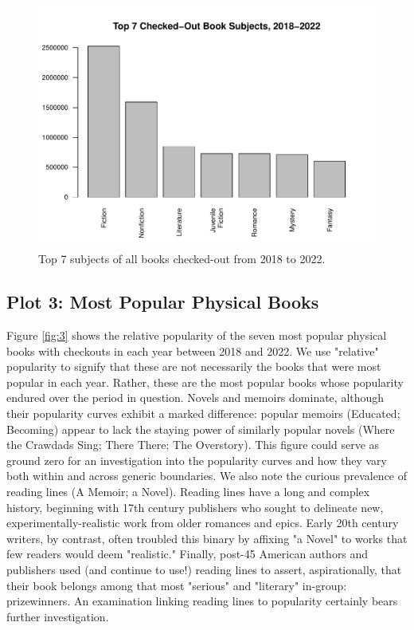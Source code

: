 \documentclass[10pt]{article}\usepackage[]{graphicx}\usepackage[]{color}
\makeatletter
\def\maxwidth{ %
  \ifdim\Gin@nat@width>\linewidth
    \linewidth
  \else
    \Gin@nat@width
  \fi
}
\newenvironment{knitrout}{}{} %
\makeatother
\begin{document}
\begin{figure}[H]
\begin{center}
\begin{knitrout}
\color{fgcolor}
\includegraphics[width=\maxwidth]{figure/plot2-1} 
\end{knitrout}
\end{center}
\caption{Top 7 subjects of all books checked-out from 2018 to 2022.}\label{fig:2}
\end{figure}

\subsection{Plot 3: Most Popular Physical Books}

Figure \ref{fig:3} shows the relative popularity of the seven most popular physical books with 
checkouts in each year between 2018 and 2022. We use "relative" popularity to signify that these are not
necessarily the books that were most popular in each year. Rather, these are the most popular books
whose popularity endured over the period in question. Novels and memoirs dominate, although their 
popularity curves exhibit a marked difference: popular memoirs (Educated; Becoming) appear to lack the staying
power of similarly popular novels (Where the Crawdads Sing; There There; The Overstory). This figure could serve as ground zero 
for an investigation into the popularity curves and how they vary both within and across generic boundaries. 
We also note the curious prevalence of reading lines (A Memoir; a Novel). Reading lines have a long and complex history, 
beginning with 17th century publishers who sought to delineate new, experimentally-realistic work from older romances and epics. 
Early 20th century writers, by contrast, often troubled this binary by affixing "a Novel" to works that few readers would
deem "realistic." Finally, post-45 American authors and publishers used (and continue to use!) reading lines
to assert, aspirationally, that their book belongs among that most "serious" and "literary" in-group: prizewinners.
An examination linking reading lines to popularity certainly bears further investigation. 
\end{document}
